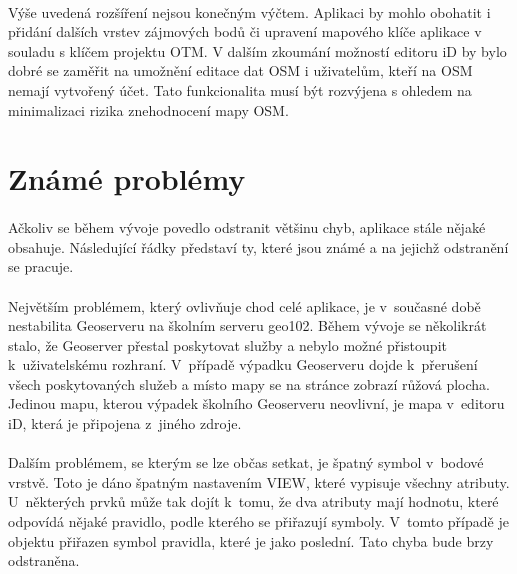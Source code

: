 \documentclass[11pt,a4paper,titlepage,oneside]{book}
\begin{document}
			\paragraph{}Výše uvedená rozšíření nejsou konečným výčtem. Aplikaci by mohlo obohatit i přidání dalších vrstev zájmových bodů či upravení mapového klíče aplikace v souladu s klíčem projektu \acl{OTM}. V dalším zkoumání možností editoru iD by bylo dobré se zaměřit na umožnění editace dat \ac{OSM} i uživatelům, kteří na \acl{OSM} nemají vytvořený účet. Tato funkcionalita musí být rozvýjena s ohledem na minimalizaci rizika znehodnocení mapy \ac{OSM}.



		\section{Známé problémy}


			\paragraph{} Ačkoliv se během vývoje povedlo odstranit většinu chyb, aplikace stále nějaké obsahuje. Následující řádky představí ty, které jsou známé a na jejichž odstranění se pracuje.
			\paragraph{} Největším problémem, který ovlivňuje chod celé aplikace, je v~současné době nestabilita Geoserveru na školním serveru geo102. Během vývoje se několikrát stalo, že Geoserver přestal poskytovat služby a nebylo možné přistoupit k~uživatelskému rozhraní. V~případě výpadku Geoserveru dojde k~přerušení všech poskytovaných služeb a místo mapy se na stránce zobrazí růžová plocha. Jedinou mapu, kterou výpadek školního Geoserveru neovlivní, je mapa v~editoru iD, která je připojena z~jiného zdroje.
			\paragraph{} Dalším problémem, se kterým se lze občas setkat, je špatný symbol v~bodové vrstvě. Toto je dáno špatným nastavením VIEW, které vypisuje všechny atributy. U~některých prvků může tak dojít k~tomu, že dva atributy mají hodnotu, které odpovídá nějaké pravidlo, podle kterého se přiřazují symboly. V~tomto případě je objektu přiřazen symbol pravidla, které je jako poslední. Tato chyba bude brzy odstraněna.
\end{document}
